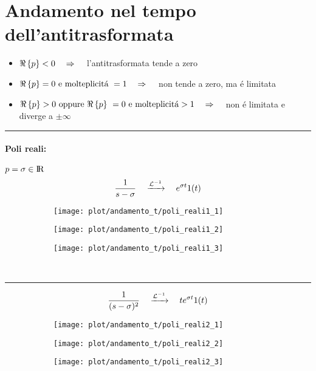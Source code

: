 \documentclass[../main.tex]{subfiles}
\begin{document}
	\section{Andamento nel tempo dell'antitrasformata}
	\begin{itemize}
		\item $ \Re \left\lbrace p \right\rbrace < 0 \quad \Rightarrow \quad $ l'antitrasformata tende a zero
		\item $ \re{p} = 0\ \text{e molteplicit\'{a}}\ = 1 \quad \Rightarrow \quad $ non tende a zero, ma \'{e} limitata
		\item $ \re{p} > 0\ \text{oppure}\ \re{p}\ = 0\ \text{e molteplicit\'{a}} > 1 \quad \Rightarrow \quad $ non \'{e} limitata e diverge a $ \pm \infty $
	\end{itemize}
	\rule{\linewidth}{0.4pt}
	\paragraph{Poli reali:} $ p = \sigma \in \rm I\!R $
	\[ \frac{1}{s-\sigma} \quad \xrightarrow{\mathcal{L}^{-1}} \quad e^{\sigma t} 1(t) \]
	\begin{figure}[h!]
		\centering
		\begin{subfigure}{0.3\textwidth}
			\texttt{[image: plot/andamento\_t/poli\_reali1\_1]}
		\end{subfigure}
		\begin{subfigure}{0.3\textwidth}
			\texttt{[image: plot/andamento\_t/poli\_reali1\_2]}
		\end{subfigure}
		\begin{subfigure}{0.3\textwidth}
			\texttt{[image: plot/andamento\_t/poli\_reali1\_3]}
		\end{subfigure}
	\end{figure}\\
	\rule{\linewidth}{0.4pt}
	\[ \frac{1}{(s-\sigma)^2} \quad \xrightarrow{\mathcal{L}^{-1}} \quad t e^{\sigma t} 1(t) \]
	\begin{figure}[h!]
		\centering
		\begin{subfigure}{0.3\textwidth}
			\texttt{[image: plot/andamento\_t/poli\_reali2\_1]}
		\end{subfigure}
		\begin{subfigure}{0.3\textwidth}
			\texttt{[image: plot/andamento\_t/poli\_reali2\_2]}
		\end{subfigure}
		\begin{subfigure}{0.3\textwidth}
			\texttt{[image: plot/andamento\_t/poli\_reali2\_3]}
		\end{subfigure}
	\end{figure}\\
\end{document}
